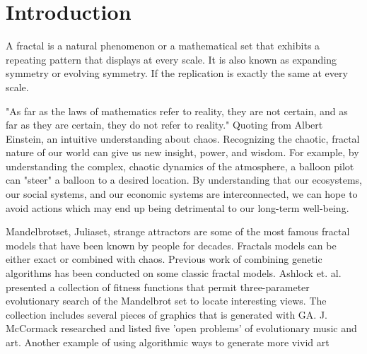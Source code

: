 \documentclass[fleqn,10pt]{SelfArx} %
\begin{document}
\flushbottom %

\maketitle %

\tableofcontents %

\thispagestyle{empty} %


\section*{Introduction} %


A fractal is a natural phenomenon or a mathematical set that exhibits
a repeating pattern that displays at every scale. It is also known as
expanding symmetry or evolving symmetry. If the replication is exactly
the same at every scale.

"As far as the laws of mathematics refer to reality, they are not certain, and as far as they are certain, they do not refer to reality." Quoting from Albert Einstein, an intuitive understanding about chaos. Recognizing the chaotic, fractal nature of our world can give us new insight, power, and wisdom. For example, by understanding the complex, chaotic dynamics of the atmosphere, a balloon pilot can "steer" a balloon to a desired location. By understanding that our ecosystems, our social systems, and our economic systems are interconnected, we can hope to avoid actions which may end up being detrimental to our long-term well-being.

Mandelbrotset, Juliaset, strange attractors are some of the most famous fractal models that have been known by people for decades. Fractals models can be either exact or combined with chaos. Previous work of combining genetic algorithms has been conducted on some classic fractal models. Ashlock et. al.~\cite{ashlock2006evolutionary} presented  a collection of fitness functions that permit three-parameter evolutionary search of the Mandelbrot set to locate interesting views. The collection includes several pieces of graphics that is generated with GA. J. McCormack \cite{mccormack2005open}  researched and listed five 'open problems'  of  evolutionary music
and art.
Another example of using algorithmic ways to generate more vivid art
\end{document}
